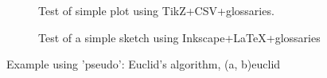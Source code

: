 \documentclass[a4paper]{article}  %
\begin{document}
    \begin{figure}[htbp]
        \centering
        \caption{Test of simple plot using TikZ+CSV+glossaries.}
		\label{fig:test}
	\end{figure}


	\begin{figure}[htbp]
		\centering
    	\caption{Test of a simple sketch using Inkscape+\LaTeX+glossaries}
		\label{ch1:fig:D1Q5}
	\end{figure}

    \begin{table}[htbp]
        \caption{Test of table tabularray+CSV+glossaries+SIunitX.}
		\label{tab:test}
	\end{table}

    \begin{table}[htbp]
        \caption{Test of table standalone manual tabularray.}
		\label{tab:test_manual}
	\end{table}

	\begin{algorithm}{Example using 'pseudo': Euclid's algorithm, (a, b)}{euclid}
    \end{algorithm}
\end{document}
